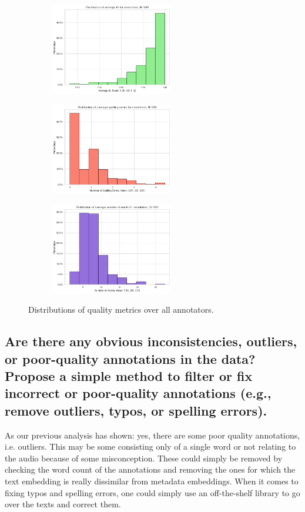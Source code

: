 \begin{figure}[htbp]
  \centering
  \begin{subfigure}[b]{0.33\textwidth}
    \includegraphics[width=\textwidth, height=4cm]{figs/ttr_dist.png}
  \end{subfigure}
  \hfill
  \begin{subfigure}[b]{0.33\textwidth}
    \includegraphics[width=\textwidth, height=4cm]{figs/error_dist.png}
  \end{subfigure}
  \hfill
  \begin{subfigure}[b]{0.33\textwidth}
    \includegraphics[width=\textwidth, height=4cm]{figs/word_dist.png}
  \end{subfigure}
  \caption{Distributions of quality metrics over all annotators.}
  \label{fig:2_d}
\end{figure}

\subsection{Are there any obvious inconsistencies, outliers, or poor-quality annotations in the data? Propose a
simple method to filter or fix incorrect or poor-quality annotations (e.g., remove outliers, typos, or
spelling errors).}
\label{sec:Annotation Quality:c2}
As our previous analysis has shown: yes, there are some poor quality annotations, i.e. outliers. This may be some consisting only of a single word or not relating to the audio because of some misconception. 
These could simply be removed by checking the word count of the annotations and removing the ones for which the text embedding is really dissimilar from metadata embeddings.
When it comes to fixing typos and spelling errors, one could simply use an off-the-shelf library to go over the texts and correct them.
